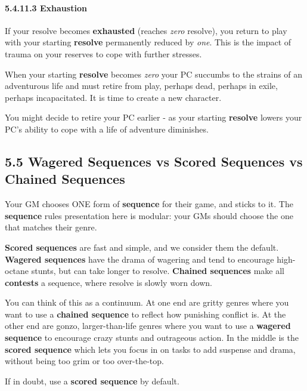 \documentclass[
  11pt,
]{article}
\begin{document}
\hypertarget{exhaustion}{%
\paragraph{5.4.11.3 Exhaustion}\label{exhaustion}}

If your resolve becomes \textbf{exhausted} (reaches \emph{zero}
resolve), you return to play with your starting \textbf{resolve}
permanently reduced by \emph{one}. This is the impact of trauma on your
reserves to cope with further stresses.

When your starting \textbf{resolve} becomes \emph{zero} your PC succumbs
to the strains of an adventurous life and must retire from play, perhaps
dead, perhaps in exile, perhaps incapacitated. It is time to create a
new character.

You might decide to retire your PC earlier - as your starting
\textbf{resolve} lowers your PC's ability to cope with a life of
adventure diminishes.

\hypertarget{wagered-sequences-vs-scored-sequences-vs-chained-sequences}{%
\subsection{5.5 Wagered Sequences vs Scored Sequences vs Chained
Sequences}\label{wagered-sequences-vs-scored-sequences-vs-chained-sequences}}

Your GM chooses ONE form of \textbf{sequence} for their game, and sticks
to it. The \textbf{sequence} rules presentation here is modular: your
GMs should choose the one that matches their genre.

\textbf{Scored sequences} are fast and simple, and we consider them the
default. \textbf{Wagered sequences} have the drama of wagering and tend
to encourage high-octane stunts, but can take longer to resolve.
\textbf{Chained sequences} make all \textbf{contests} a sequence, where
resolve is slowly worn down.

You can think of this as a continuum. At one end are gritty genres where
you want to use a \textbf{chained sequence} to reflect how punishing
conflict is. At the other end are gonzo, larger-than-life genres where
you want to use a \textbf{wagered sequence} to encourage crazy stunts
and outrageous action. In the middle is the \textbf{scored sequence}
which lets you focus in on tasks to add suspense and drama, without
being too grim or too over-the-top.

If in doubt, use a \textbf{scored sequence} by default.
\end{document}
